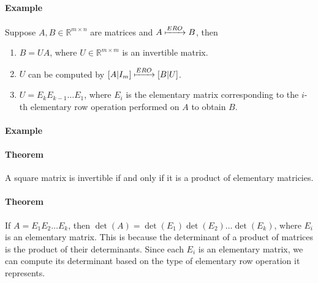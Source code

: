 \paragraph*{Example} %

Suppose $A, B \in \mathbb{R}^{m \times n}$ are matrices and $A \xmapsto{ERO} B$, then
\begin{enumerate}
    \item $B = UA$, where $U \in \mathbb{R}^{m \times m}$ is an invertible matrix.
    \item $U$ can be computed by $[A | I_m] \xmapsto{ERO} [B | U]$.
    \item $U = E_k E_{k-1} \ldots E_1$, where $E_i$ is the elementary matrix corresponding to the $i$-th elementary row operation performed on $A$ to obtain $B$.
\end{enumerate}

\paragraph*{Example} %

\paragraph*{Theorem}
A square matrix is invertible if and only if it is a product of elementary matricies.

\paragraph*{Theorem}
If $A = E_1 E_2 \ldots E_k$, then $\det(A) = \det(E_1) \det(E_2) \ldots \det(E_k)$, where $E_i$ is an elementary matrix. 
This is because the determinant of a product of matrices is the product of their determinants. Since each $E_i$ is an elementary matrix, 
we can compute its determinant based on the type of elementary row operation it represents.